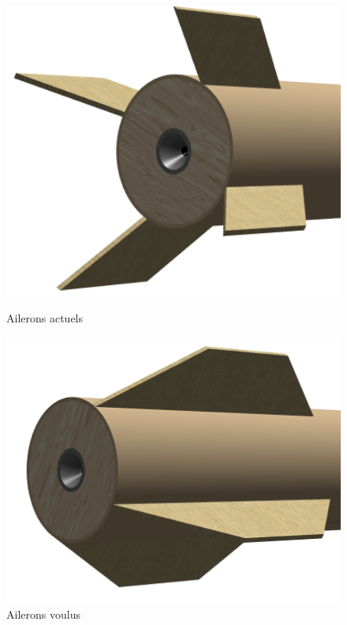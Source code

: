 \documentclass[6pt,a4paper]{article}
\begin{document}
\begin{figure}[h]
	\begin{minipage}[t]{0.45\textwidth}
		\begin{center}
			\includegraphics[width=1\textwidth]{pics/ailerons.png}
		\end{center}
		\caption{\small Ailerons actuels}
	\end{minipage}
	\hfill
	\begin{minipage}[t]{0.45\textwidth}
		\begin{center}
			\includegraphics[width=1\textwidth]{pics/ailerons_voulus.png}
		\end{center}
		\caption{\small Ailerons voulus}
	\end{minipage}
\end{figure}
\end{document}
